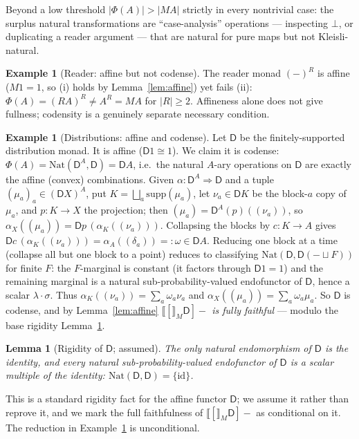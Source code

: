 \documentclass[11pt]{amsart}
\theoremstyle{plain}
\newtheorem{lemma}[theorem]{Lemma}
\theoremstyle{definition}
\newtheorem{example}[theorem]{Example}
\newcommand{\Nat}{\mathrm{Nat}}
\newcommand{\extM}[1]{\llbracket #1 \rrbracket_{M}}
\newcommand{\id}{\mathrm{id}}
\newcommand{\D}{\mathsf{D}}
\newcommand{\supp}{\mathrm{supp}}
\begin{document}
Beyond a low threshold $|\Phi(A)|>|MA|$ strictly in every nontrivial case: the surplus natural
transformations are ``case-analysis'' operations --- inspecting $\bot$, or duplicating a reader
argument --- that are natural for pure maps but not Kleisli-natural.

\begin{example}[Reader: affine but not codense]\label{ex:reader}
The reader monad $(-)^R$ is affine ($M1=1$, so (i) holds by Lemma~\ref{lem:affine}) yet fails (ii):
$\Phi(A)=(RA)^{R}\ne A^{R}=MA$ for $|R|\ge2$. Affineness alone does not give fullness; codensity is a
genuinely separate necessary condition.
\end{example}

\begin{example}[Distributions: affine and codense]\label{ex:D}
Let $\D$ be the finitely-supported distribution monad. It is affine ($\D1\cong1$). We claim it is
codense: $\Phi(A)=\Nat(\D^{A},\D)=\D A$, i.e.\ the natural $A$-ary operations on $\D$ are exactly the
affine (convex) combinations. Given $\alpha\colon\D^{A}\Rightarrow\D$ and a tuple
$(\mu_a)_a\in(\D X)^A$, put $K=\bigsqcup_a\supp(\mu_a)$, let $\nu_a\in\D K$ be the block-$a$ copy of
$\mu_a$, and $p\colon K\to X$ the projection; then $(\mu_a)=\D^{A}(p)((\nu_a))$, so
$\alpha_X((\mu_a))=\D p\,(\alpha_K((\nu_a)))$. Collapsing the blocks by $c\colon K\to A$ gives
$\D c\,(\alpha_K((\nu_a)))=\alpha_A((\delta_a))=:\omega\in\D A$. Reducing one block at a time (collapse
all but one block to a point) reduces to classifying $\Nat(\D,\D(-\sqcup F))$ for finite $F$: the
$F$-marginal is constant (it factors through $\D1=1$) and the remaining marginal is a natural
sub-probability-valued endofunctor of $\D$, hence a scalar $\lambda\cdot\sigma$. Thus
$\alpha_K((\nu_a))=\sum_a\omega_a\nu_a$ and $\alpha_X((\mu_a))=\sum_a\omega_a\mu_a$. So $\D$ is
codense, and by Lemma~\ref{lem:affine} \emph{$\extM[\D]{-}$ is fully faithful} --- modulo the base
rigidity Lemma~\ref{lem:Drigid}.
\end{example}

\begin{lemma}[Rigidity of $\D$; assumed]\label{lem:Drigid}
The only natural endomorphism of $\D$ is the identity, and every natural sub-probability-valued
endofunctor of $\D$ is a scalar multiple of the identity: $\Nat(\D,\D)=\{\id\}$.
\end{lemma}

This is a standard rigidity fact for the affine functor $\D$; we assume it rather than reprove it,
and we mark the full faithfulness of $\extM[\D]{-}$ as conditional on it. The reduction in
Example~\ref{ex:D} is unconditional.
\end{document}
